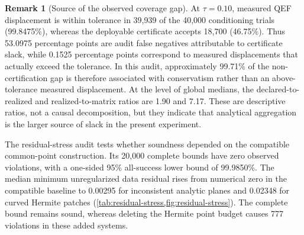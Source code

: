 \documentclass[11pt]{article}
\theoremstyle{definition}
\newtheorem{remark}[theorem]{Remark}
\begin{document}
\begin{remark}[Source of the observed coverage gap]
\label{rem:gap-source}
At \(\tau=0.10\), measured QEF displacement is within tolerance in 39,939 of
the 40,000 conditioning trials (99.8475\%), whereas the deployable certificate
accepts 18,700 (46.75\%).  Thus 53.0975 percentage points are audit false
negatives attributable to certificate slack, while 0.1525 percentage points
correspond to measured displacements that actually exceed the tolerance.  In
this audit, approximately 99.71\% of the non-certification gap is therefore
associated with conservatism rather than an above-tolerance measured
displacement.  At the level of global medians, the declared-to-realized and
realized-to-matrix ratios are 1.90 and 7.17.  These are descriptive ratios, not
a causal decomposition, but they indicate that analytical aggregation is the
larger source of slack in the present experiment.
\end{remark}

The residual-stress audit tests whether soundness depended on the compatible
common-point construction.  Its 20,000 complete bounds have zero observed
violations, with a one-sided 95\% all-success lower bound of 99.9850\%.
The median minimum unregularized data residual rises from numerical zero in the
compatible baseline to 0.00295 for inconsistent analytic planes and 0.02348
for curved Hermite patches (\cref{tab:residual-stress,fig:residual-stress}).
The complete bound remains sound, whereas deleting the Hermite point budget
causes 777 violations in these added systems.

\begin{table}[t]
\centering
\caption{Residual-stress extension of the QEF audit.  ``Measured'' and
``declared'' are coverage at \(\tau=0.10\).  The compatible baseline is the
original 40,000-system conditioning audit.}
\label{tab:residual-stress}
\end{table}
\end{document}
